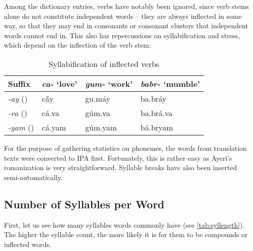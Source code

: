 Among the dictionary entries, verbs have notably been ignored, since verb stems 
alone do not constitute independent words -- they are always inflected in some 
way, so that they may end in consonants or consonant clusters that independent 
words cannot end in. This also has repercussions on syllabification and stress, 
which depend on the inflection of the verb stem:

\begin{table}[h]
\caption{Syllabification of inflected verbs}
\begin{tabu} to \linewidth {X[2l] X[3c] X[3c] X[3c]}
\toprule\tableheaderfont
Suffix
	& \emph{ca-} `love'
	& \emph{gum-} `work'
	& \emph{babr-} `mumble'
	\\

\toprule

\emph{-ay} (\Fsg{})
	& cā́y
	& gu.máy
	& ba.bráy
	\\

\emph{-va} (\Ssg{})
	& cá.va
	& gúm.va
	& ba.brá.va
	\\

\emph{-yam} (\Ptcp{})
	& cá.yam
	& gúm.yam
	& bá.bryam
	\\

\bottomrule
\end{tabu}
\label{ex:verbsyll}
\end{table}

For the purpose of gathering statistics on phonemes, 
the words from translation texts were converted to IPA first. Fortunately, this 
is rather easy as Ayeri's romanization is very straightforward. Syllable breaks 
have also been inserted semi-automatically.

\subsection{Number of Syllables per Word}

First, let us see how many syllables words commonly have (see 
\autoref{tab:syllength}). The higher the syllable count, the more likely it is for 
them to be compounds or inflected words.

